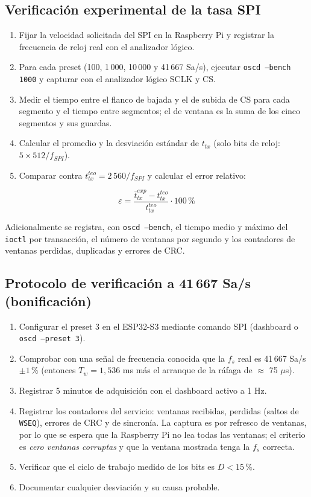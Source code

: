 \documentclass[12pt,a4paper]{article}
\begin{document}
\subsection{Verificación experimental de la tasa SPI}

\begin{enumerate}
  \item Fijar la velocidad solicitada del SPI en la Raspberry Pi y registrar la frecuencia de reloj real con el analizador lógico.
  \item Para cada preset (100, 1\,000, 10\,000 y 41\,667 Sa/s), ejecutar \texttt{oscd --bench 1000} y capturar con el analizador lógico SCLK y CS.
  \item Medir el tiempo entre el flanco de bajada y el de subida de CS para cada segmento y el tiempo entre segmentos; el de ventana es la suma de los cinco segmentos y sus guardas.
  \item Calcular el promedio y la desviación estándar de $t_{tx}$ (solo bits de reloj: $5 \times 512 / f_{SPI}$).
  \item Comparar contra $t_{tx}^{teo} = 2\,560/f_{SPI}$ y calcular el error relativo:
\end{enumerate}

\begin{equation}
\varepsilon = \frac{\bar{t}_{tx}^{exp} - t_{tx}^{teo}}{t_{tx}^{teo}} \cdot 100\,\%
\end{equation}

Adicionalmente se registra, con \texttt{oscd --bench}, el tiempo medio y máximo del \texttt{ioctl} por transacción, el número de ventanas por segundo y los contadores de ventanas perdidas, duplicadas y errores de CRC.

\subsection{Protocolo de verificación a 41\,667 Sa/s (bonificación)}

\begin{enumerate}
  \item Configurar el preset 3 en el ESP32-S3 mediante comando SPI (dashboard o \texttt{oscd --preset 3}).
  \item Comprobar con una señal de frecuencia conocida que la $f_s$ real es 41\,667 Sa/s $\pm 1\,\%$ (entonces $T_w = 1{,}536$ ms más el arranque de la ráfaga de $\approx$ 75 $\mu$s).
  \item Registrar 5 minutos de adquisición con el dashboard activo a 1 Hz.
  \item Registrar los contadores del servicio: ventanas recibidas, perdidas (saltos de \texttt{WSEQ}), errores de CRC y de sincronía. La captura es por refresco de ventanas, por lo que se espera que la Raspberry Pi no lea todas las ventanas; el criterio es \emph{cero ventanas corruptas} y que la ventana mostrada tenga la $f_s$ correcta.
  \item Verificar que el ciclo de trabajo medido de los bits es $D < 15\,\%$.
  \item Documentar cualquier desviación y su causa probable.
\end{enumerate}
\end{document}
